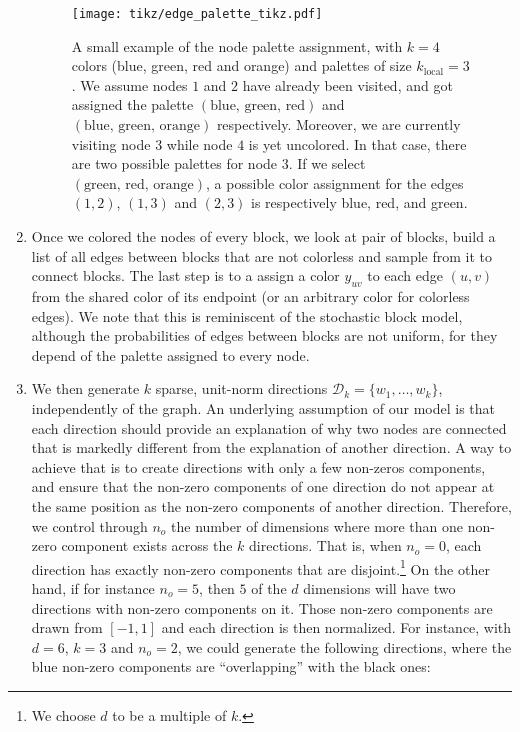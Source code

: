 \begin{enumerate}[1),leftmargin=*]
\begin{figure}[ht]
  \texttt{[image: tikz/edge\_palette\_tikz.pdf]}
  \caption{A small example of the node palette assignment, with $k=4$ colors (blue, green, red and
    orange) and palettes of size $k_\mathrm{local}=3$. We assume nodes $1$ and $2$ have already been
    visited, and got assigned the palette $(\text{blue, green, red})$ and $(\text{blue, green,
    orange})$ respectively. Moreover, we are currently visiting node $3$ while node $4$ is yet uncolored. In that
    case, there are two possible palettes for node $3$. If we select $(\text{green, red, orange})$, a
    possible color assignment for the edges $(1,2)$, $(1, 3)$ and $(2, 3)$ is respectively blue,
    red, and green.
  \label{fig:edge_palette}}
\end{figure}

\item
Once we colored the nodes of every block, we look at pair
of blocks, build a list of all edges between blocks that are not colorless and sample from it to
connect blocks. The last step is to a assign a color $y_{uv}$ to each edge $(u,v)$ from the shared color of its
endpoint (or an arbitrary color for colorless edges). We note that this is reminiscent of the stochastic
block model, although the probabilities of edges between blocks are not uniform, for they depend of
the palette assigned to every node.

  \item 
We then generate $k$ sparse, unit-norm directions $\mathcal{D}_k=\{w_1, \ldots, w_k\}$,
independently of the graph. An underlying assumption of our model is that each direction should
provide an explanation of why two nodes are connected that is markedly different from the
explanation of another direction. A way to achieve that is to create directions with only a few
non-zeros components, and ensure that the non-zero components of one direction do not appear at the
same position as the non-zero components of another direction. Therefore, we control through $n_o$
the number of dimensions where more than one non-zero component exists across the $k$ directions.
That is, when $n_o = 0$, each direction has exactly  non-zero components that are
disjoint.\footnote{We choose $d$ to be a multiple of $k$.} On the other hand, if for instance $n_o=5$,
then $5$ of the $d$ dimensions will have two directions with non-zero components on it. Those
non-zero components are drawn \uar{} from $[-1, 1]$ and each direction is then normalized. For
instance, with $d=6$, $k=3$ and $n_o=2$, we could generate the following directions, where the blue
non-zero components are \enquote{overlapping} with the black ones:


\end{enumerate}

